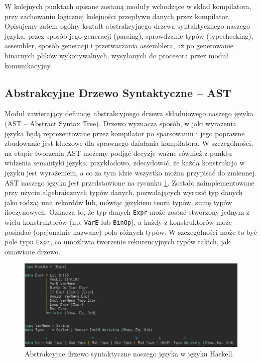 W kolejnych punktach opisane zostaną moduły wchodzące w skład kompilatora, przy zachowaniu logicznej kolejności przepływu danych przez kompilator. Opisujemy zatem ogólny kształt  abstrakcyjnego drzewa syntaktycznego naszego języka, przez sposób jego generacji (parsing), sprawdzanie typów (typechecking), assembler, sposób generacji i przetwarzania assemblera, aż po generowanie binarnych plików wykonywalnych, wysyłanych do procesora przez moduł komunikacyjny.

\subsection{Abstrakcyjne Drzewo Syntaktyczne -- AST}

Moduł zawierający definicję abstrakcyjnego drzewa składniowego naszego języka (AST -- Abstract Syntax Tree). Drzewo wyznacza sposób, w jaki wyrażenia języka będą reprezentowane przez kompilator po sparsowaniu i jego poprawne zbudowanie jest kluczowe dla sprawnego działania kompilatora. W szczególności, na etapie tworzenia AST możemy podjąć decyzje ważne również z punktu widzenia semantyki języka: przykładowo, zdecydować, że każda konstrukcja w języku jest wyrażeniem, a co za tym idzie wszystko można przypisać do zmiennej. AST naszego języka jest przedstawione na rysunku \ref{fig:ast}. Zostało zaimplementowane przy użyciu algebraicznych typów danych, pozwalających wyrazić typ danych jako rodzaj unii rekordów lub, mówiąc językiem teorii typów, sumę typów iloczynowych. Oznacza to, że typ danych \texttt{Expr} może zostać stworzony jednym z wielu konstruktorów (np. \texttt{VarE} lub \texttt{BinOp}), a każdy z konstruktorów może posiadać (opcjonalnie nazwane) pola różnych typów. W szczególności może to być pole typu \texttt{Expr}, co umożliwia tworzenie rekurencyjnych typów takich, jak omawiane drzewo.

\begin{figure}
  \begin{center}
    \includegraphics[scale=0.5]{images/AST.png}
    \caption{Abstrakcyjne drzewo syntaktyczne naszego języka w języku Haskell.}
    \label{fig:ast}
  \end{center}
\end{figure}

